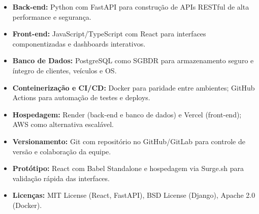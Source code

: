 \documentclass[12pt, a4paper]{article}
\begin{document}
\begin{itemize}
    \item \textbf{Back-end:} Python com FastAPI para construção de APIs RESTful de alta performance e segurança.
    \item \textbf{Front-end:} JavaScript/TypeScript com React para interfaces componentizadas e dashboards interativos.
    \item \textbf{Banco de Dados:} PostgreSQL como SGBDR para armazenamento seguro e íntegro de clientes, veículos e OS.
    \item \textbf{Conteinerização e CI/CD:} Docker para paridade entre ambientes; GitHub Actions para automação de testes e deploys.
    \item \textbf{Hospedagem:} Render (back-end e banco de dados) e Vercel (front-end); AWS como alternativa escalável.
    \item \textbf{Versionamento:} Git com repositório no GitHub/GitLab para controle de versão e colaboração da equipe.
    \item \textbf{Protótipo:} React com Babel Standalone e hospedagem via Surge.sh para validação rápida das interfaces.
    \item \textbf{Licenças:} MIT License (React, FastAPI), BSD License (Django), Apache 2.0 (Docker).
\end{itemize}
\end{document}
